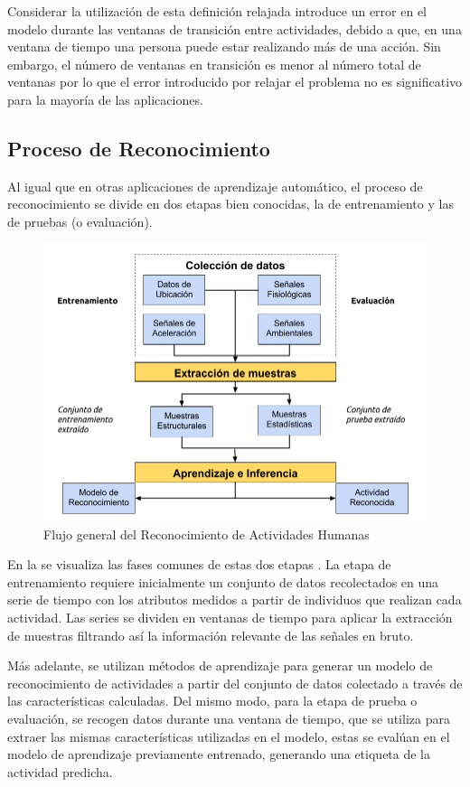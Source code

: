 Considerar la utilización de esta definición relajada introduce un
error en el modelo durante las ventanas de transición entre actividades,
debido a que, en una ventana de tiempo una persona puede estar realizando
más de una acción. Sin embargo, el número de ventanas en transición
es menor al número total de ventanas por lo que el error introducido
por relajar el problema no es significativo para la mayoría de las
aplicaciones.

\subsection{Proceso de Reconocimiento }

\label{sec262:proceso-har}Al igual que en otras aplicaciones de aprendizaje
automático, el proceso de reconocimiento se divide en dos etapas bien
conocidas, la de entrenamiento y las de pruebas (o evaluación).

\begin{figure}[!htbp]
\centering{} \includegraphics[width=0.7\linewidth]{capitulo-2/graphics/harsystem}
\caption[Flujograma]{\label{fig2:harsystem}Flujo general del Reconocimiento de Actividades
Humanas}
 
\end{figure}

En la  se visualiza las fases comunes de estas
dos etapas \cite{LaraLabrador2013}. La etapa de entrenamiento requiere
inicialmente un conjunto de datos recolectados en una serie de tiempo
con los atributos medidos a partir de individuos que realizan cada
actividad. Las series se dividen en ventanas de tiempo para aplicar
la extracción de muestras filtrando así la información relevante de
las señales en bruto. 

Más adelante, se utilizan métodos de aprendizaje para generar un modelo
de reconocimiento de actividades a partir del conjunto de datos colectado
a través de las características calculadas. Del mismo modo, para la
etapa de prueba o evaluación, se recogen datos durante una ventana
de tiempo, que se utiliza para extraer las mismas características
utilizadas en el modelo, estas se evalúan en el modelo de aprendizaje
previamente entrenado, generando una etiqueta de la actividad predicha.

